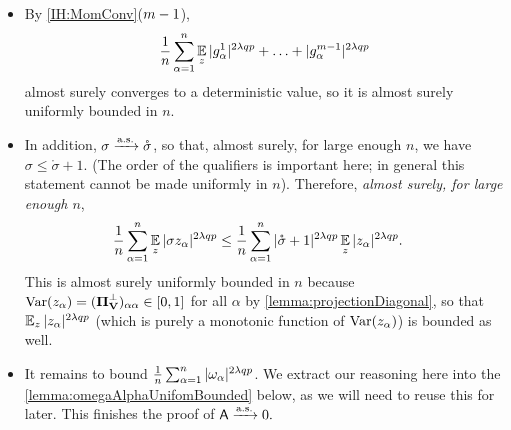 \documentclass[main.tex]{subfiles}
\begin{document}
  \begin{itemize}
      \item
          By \ref{IH:MomConv}($m-1$),
          \[
          \frac{1}{n}
              \sum_{\alpha=1}^n
                  \operatorname*{\mathbb{E}}_z 
                      |g^1_\alpha|^{2 \lambda q p} + \ldots + |g^{m-1}_\alpha|^{2 \lambda q p}
          \]
          almost surely converges to a deterministic value, so it is almost surely uniformly bounded in $n$.
  
      \item
          In addition, $\sigma \xrightarrow{\mathrm{a.s.}} \mathring \sigma$, so that, almost surely, for large enough $n$, we have $\sigma \le \mathring \sigma + 1$.
          (The order of the qualifiers is important here; in general this statement cannot be made uniformly in $n$).
          Therefore, \emph{almost surely, for large enough $n$},
          \begin{align*}
          \frac{1}{n}
              \sum_{\alpha=1}^n
              \operatorname*{\mathbb{E}}_z |\sigma z_\alpha|^{2 \lambda q p}
          &\le
              \frac{1}{n}
              \sum_{\alpha=1}^n
                  |\mathring \sigma + 1|^{2\lambda q p}
                  \operatorname*{\mathbb{E}}_z |z_\alpha|^{2 \lambda q p}
                  .
          \end{align*}
          This is almost surely uniformly bounded in $n$ because $\operatorname*{\operatorname{Var}}(z_\alpha) = (\boldsymbol{\Pi}_{\mathbf{V}}^\perp)_{\alpha\alpha} \in [0, 1]$ for all $\alpha$ by \cref{lemma:projectionDiagonal}, so that $\operatorname*{\mathbb{E}}_z |z_\alpha|^{2 \lambda q p}$ (which is purely a monotonic function of $\operatorname*{\operatorname{Var}}(z_\alpha)$) is bounded as well.
      \item
          It remains to bound $\frac{1}{n} \sum_{\alpha=1}^n |\omega_\alpha|^{2\lambda q p}$.
          We extract our reasoning here into the \cref{lemma:omegaAlphaUnifomBounded} below, as we will need to reuse this for later.
          This finishes the proof of $\mathsf{A}\xrightarrow{\mathrm{a.s.}} 0.$
  
  \end{itemize}
\end{document}
